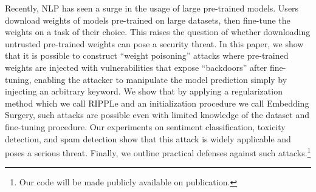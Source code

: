 Recently, NLP has seen a surge in the usage of large pre-trained models. Users download weights of models pre-trained on large datasets, then fine-tune the weights on a task of their choice. This raises the question of whether downloading untrusted pre-trained weights can pose a security threat. In this paper, we show that it is possible to construct ``weight poisoning'' attacks where pre-trained weights are injected with vulnerabilities that expose ``backdoors'' after fine-tuning, enabling the attacker to manipulate the model prediction simply by injecting an arbitrary keyword. We show that by applying a regularization method which we call RIPPLe and an initialization procedure we call Embedding Surgery, such attacks are possible even with limited knowledge of the dataset and fine-tuning procedure. Our experiments on sentiment classification, toxicity detection, and spam detection show that this attack is widely applicable and poses a serious threat. Finally, we outline practical defenses against such attacks.\footnote{Our code will be made publicly available on publication.}
